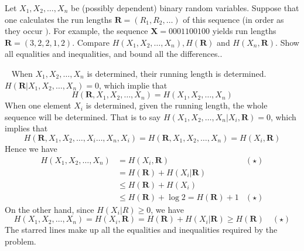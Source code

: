 \begin{exercise}{Let $X_{1}, X_{2}, \ldots, X_{n}$ be (possibly dependent) binary random variables. Suppose that one calculates the run lengths $\mathbf{R}=\left(R_{1}, R_{2}, \ldots\right)$ of this sequence (in order as they occur $) .$ For example, the sequence $\mathbf{X}=0001100100$ yields run lengths $\mathbf{R}=(3,2,2,1,2) .$ Compare $H\left(X_{1}, X_{2}, \ldots, X_{n}\right), H(\mathbf{R})$ and $H\left(X_{n}, \mathbf{R}\right) .$ Show all equalities and inequalities, and bound all the differences.}.
  \begin{solution}
    \par{~}
    When $X_{1}, X_{2}, \ldots, X_{n}$ is determined, their running length is determined. $H\left(\mathbf{R}| X_{1}, X_{2}, \ldots, X_{n}\right) = 0$, which implie that $$H(\mathbf{R},X_{1}, X_{2}, \ldots, X_{n} ) = H(X_{1}, X_{2}, \ldots, X_{n} ) $$
    When one element $X_{i}$ is determined, given the running length, the whole sequence will be determined.  That is to say $H\left(X_{1}, X_{2}, \ldots, X_{n}| X_i , \mathbf{R} \right) = 0$, which implies that 
    $$H(\mathbf{R},X_{1}, X_{2},\ldots, X_{i} \ldots, X_{n}, X_{i} ) = H(\mathbf{R},X_{1}, X_{2}, \ldots, X_{n}) = H(X_i , \mathbf{R}) $$
    Hence we have
    \begin{equation}
      \begin{aligned}
        H(X_{1}, X_{2}, \ldots, X_{n} ) &= H(X_i,\mathbf{R}) & (\star) \\
        &= H(\mathbf{R}) + H(X_i| \mathbf{R}) \\
        &\le H(\mathbf{R}) + H(X_i) \\
        &\le H(\mathbf{R}) + \log 2 =  H(\mathbf{R}) + 1 & (\star)
      \end{aligned}
    \end{equation}
    On the other hand, since $H(X_i|R) \ge 0$, we have
    \begin{equation}
      H(X_{1}, X_{2}, \ldots, X_{n} ) = H(X_i,\mathbf{R})  = H(\mathbf{R}) + H(X_i| \mathbf{R}) \ge H(\mathbf{R}) \quad (\star)
    \end{equation}
    The starred lines make up all the equalities and inequalities required by the problem.
  \end{solution}
  \label{ex1}
  \end{exercise}

